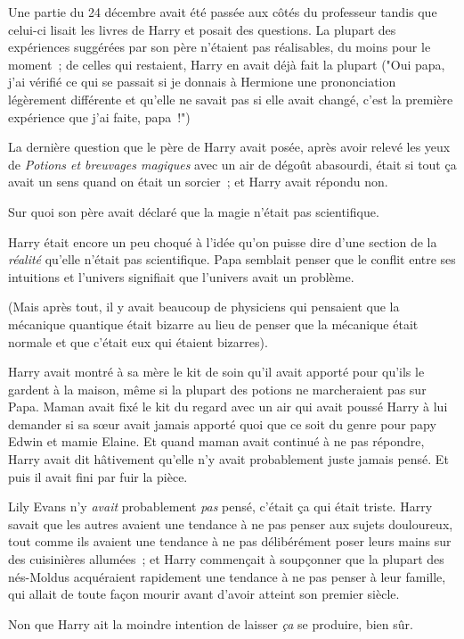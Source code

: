 Une partie du 24 décembre avait été passée aux côtés du professeur tandis que celui-ci lisait les livres de Harry et posait des questions. La plupart des expériences suggérées par son père n'étaient pas réalisables, du moins pour le moment~; de celles qui restaient, Harry en avait déjà fait la plupart ("Oui papa, j'ai vérifié ce qui se passait si je donnais à Hermione une prononciation légèrement différente et qu'elle ne savait pas si elle avait changé, c'est la première expérience que j'ai faite, papa~!")

La dernière question que le père de Harry avait posée, après avoir relevé les yeux de \emph{Potions et breuvages magiques} avec un air de dégoût abasourdi, était si tout ça avait un sens quand on était un sorcier~; et Harry avait répondu non.

Sur quoi son père avait déclaré que la magie n'était pas scientifique.

Harry était encore un peu choqué à l'idée qu'on puisse dire d'une section de la \emph{réalité} qu'elle n'était pas scientifique. Papa semblait penser que le conflit entre ses intuitions et l'univers signifiait que l'univers avait un problème.

(Mais après tout, il y avait beaucoup de physiciens qui pensaient que la mécanique quantique était bizarre au lieu de penser que la mécanique était normale et que c'était eux qui étaient bizarres).

Harry avait montré à sa mère le kit de soin qu'il avait apporté pour qu'ils le gardent à la maison, même si la plupart des potions ne marcheraient pas sur Papa. Maman avait fixé le kit du regard avec un air qui avait poussé Harry à lui demander si sa sœur avait jamais apporté quoi que ce soit du genre pour papy Edwin et mamie Elaine. Et quand maman avait continué à ne pas répondre, Harry avait dit hâtivement qu'elle n'y avait probablement juste jamais pensé. Et puis il avait fini par fuir la pièce.

Lily Evans n'y \emph{avait} probablement \emph{pas} pensé, c'était ça qui était triste. Harry savait que les autres avaient une tendance à ne pas penser aux sujets douloureux, tout comme ils avaient une tendance à ne pas délibérément poser leurs mains sur des cuisinières allumées~; et Harry commençait à soupçonner que la plupart des nés-Moldus acquéraient rapidement une tendance à ne pas penser à leur famille, qui allait de toute façon mourir avant d'avoir atteint son premier siècle.

Non que Harry ait la moindre intention de laisser \emph{ça} se produire, bien sûr.

